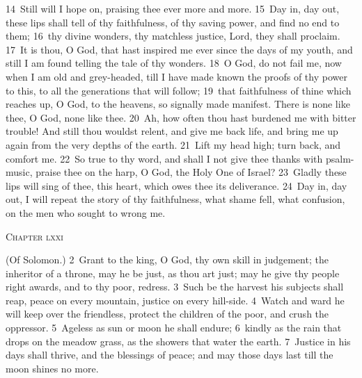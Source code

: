 \documentclass[10pt]{book} %
\begin{document}
\textcolor{benred8}{14}~Still will I hope on, praising thee ever more and more. \textcolor{benred8}{15}~Day in, day out, these lips shall tell of thy faithfulness, of thy saving power, and find no end to them; \textcolor{benred8}{16}~thy divine wonders, thy matchless justice, Lord, they shall proclaim. \textcolor{benred8}{17}~It is thou, O God, that hast inspired me ever since the days of my youth, and still I am found telling the tale of thy wonders. \textcolor{benred8}{18}~O God, do not fail me, now when I am old and grey-headed, till I have made known the proofs of thy power to this, to all the generations that will follow; \textcolor{benred8}{19}~that faithfulness of thine which reaches up, O God, to the heavens, so signally made manifest. There is none like thee, O God, none like thee. \textcolor{benred8}{20}~Ah, how often thou hast burdened me with bitter trouble! And still thou wouldst relent, and give me back life, and bring me up again from the very depths of the earth. \textcolor{benred8}{21}~Lift my head high; turn back, and comfort me. \textcolor{benred8}{22}~So true to thy word, and shall I not give thee thanks with psalm-music, praise thee on the harp, O God, the Holy One of Israel? \textcolor{benred8}{23}~Gladly these lips will sing of thee, this heart, which owes thee its deliverance. \textcolor{benred8}{24}~Day in, day out, I will repeat the story of thy faithfulness, what shame fell, what confusion, on the men who sought to wrong me.
\begin{large}\begin{center}\textsc{Chapter lxxi}\end{center}\end{large}
(Of Solomon.)
\textcolor{benred8}{2}~Grant to the king, O God, thy own skill in judgement; the inheritor of a throne, may he be just, as thou art just; may he give thy people right awards, and to thy poor, redress. \textcolor{benred8}{3}~Such be the harvest his subjects shall reap, peace on every mountain, justice on every hill-side. \textcolor{benred8}{4}~Watch and ward he will keep over the friendless, protect the children of the poor, and crush the oppressor. \textcolor{benred8}{5}~Ageless as sun or moon he shall endure; \textcolor{benred8}{6}~kindly as the rain that drops on the meadow grass, as the showers that water the earth. \textcolor{benred8}{7}~Justice in his days shall thrive, and the blessings of peace; and may those days last till the moon shines no more.
\end{document}
